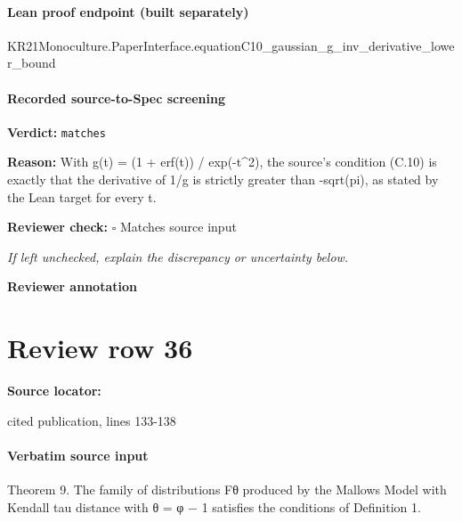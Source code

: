 \documentclass[10pt]{article}
\newcommand{\reviewerbox}{%
  \par\noindent\fbox{\parbox{0.96\linewidth}{\rule{0pt}{0.38in}}}\par
}
\newcommand{\reviewmatch}[1]{%
  \par\noindent\textbf{Reviewer check:} $\square$\; #1\par
  \noindent\emph{If left unchecked, explain the discrepancy or uncertainty below.}\par
}
\begin{document}
\paragraph{Lean proof endpoint (built separately)}\begin{ReviewVerbatim}
KR21Monoculture.PaperInterface.equationC10_gaussian_g_inv_derivative_lower_bound
\end{ReviewVerbatim}

\paragraph{Recorded source-to-Spec screening}
\textbf{Verdict:} \texttt{matches}
\\
{\raggedright
\textbf{Reason:} With g(t) = (1 + erf(t)) /\allowbreak{} exp(-\allowbreak{}t\textasciicircum{}2), the source's condition (C.\allowbreak{}10) is exactly that the derivative of 1/\allowbreak{}g is strictly greater than -\allowbreak{}sqrt(pi), as stated by the Lean target for every t.\allowbreak{}
\par}
\reviewmatch{Matches source input}
\noindent\textbf{Reviewer annotation}\par
\reviewerbox
\clearpage
\hypertarget{source-claim-d732fbc16f2ecdeb}{}
\section*{Review row 36}
\textbf{Source locator:} {\footnotesize\raggedright cited publication, lines 133-\allowbreak{}138\par}
\paragraph{Verbatim source input}
\begin{ReviewVerbatim}
Theorem 9. The family of distributions Fθ produced by the Mallows Model with Kendall tau distance with
θ = φ − 1 satisfies the conditions of Definition 1.
\end{ReviewVerbatim}
\end{document}

